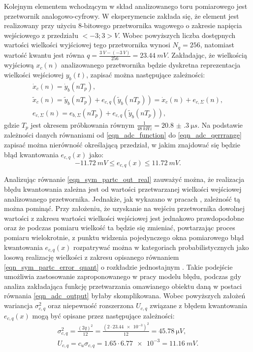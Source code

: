 Kolejnym elementem wchodzącym w skład analizowanego toru pomiarowego jest przetwornik analogowo-cyfrowy. W eksperymencie zakłada się, że element jest realizowany przy użyciu 8-bitowego przetwornika wagowego o zakresie napięcia wejściowego z przedziału $<-3;3>\unit{V}$. Wobec powyższych liczba dostępnych wartości wielkości wyjściowej tego przetwornika wynosi $N_{q} = 256$, natomiast wartość kwantu jest równa $q = \frac{\qty{3}{V} - (\qty{-3}{V})}{256} = \qty{23.44}{mV}$. Zakładając, że wielkością wyjściową $x_{c}(n)$ analizowanego przetwornika będzie dyskretna reprezentacja wielkości wejściowej $y_{b}(t)$, zapisać można następujące zależności:
\begin{gather}
\dot{x}_{c}(n) = \dot{y}_{b}(nT_{p}) \label{eqn_sym_partc_out_ideal}, \\
\tilde{x}_{c}(n) = \tilde{y}_{b}(nT_{p}) + e_{c,q}(\tilde{y}_{b}(nT_{p})) = \dot{x}_{c}(n) + e_{c,\Sigma}(n) \label{eqn_sym_partc_out_real}, \\
e_{c,\Sigma}(n) = e_{b,\Sigma}(nT_{p}) + e_{c,q}(\tilde{y}_{b}(nT_{p})) \label{eqn_sym_partc_error_sum},
\end{gather}
gdzie $T_{p}$ jest okresem próbkowania równym $\frac{1}{\qty{48}{kHz}} = \qty{20.8(3)}{\micro s}$.
Na podstawie zależności danych równaniami od \eqref{eqn_adc_function} do \eqref{eqn_adc_qerrrange} zapisać można nierówność określającą przedział, w jakim znajdować się będzie błąd kwantowania $e_{c,q}(x)$ jako:
\begin{equation}
\qty{-11.72}{mV} \le e_{c,q}(x) \le \qty{11.72}{mV} \label{eqn_sym_partc_error_quant}.
\end{equation}

Analizując równanie \eqref{eqn_sym_partc_out_real} zauważyć można, że realizacja błędu kwantowania zależna jest od wartości przetwarzanej wielkości wejściowej analizowanego przetwornika. Jednakże, jak wykazano w pracach \cite{sienkowski_kwant, sienkowski_adc}, zależność tą można pominąć. Przy założeniu, że uzyskanie na wejściu przetwornika dowolnej wartości z zakresu wartości wielkości wejściowej jest jednakowo prawdopodobne oraz że podczas pomiaru wielkość ta będzie się zmieniać, powtarzając proces pomiaru wielokrotnie, z punktu widzenia pojedynczego okna pomiarowego błąd kwantowania $e_{c,q}(x)$ rozpatrywać można w kategoriach probabilistycznych jako losową realizację wielkości z zakresu opisanego równaniem \eqref{eqn_sym_partc_error_quant} o rozkładzie jednostajnym \cite{jakubiec_system}. Takie podejście umożliwia zastosowanie zaproponowanego w pracy modelu błędu, podczas gdy analiza zakładająca funkcję przetwarzania omawianego obiektu daną w postaci równania \eqref{eqn_adc_output} byłaby skomplikowana. Wobec powyższych założeń wariancja $\sigma_{c,q}^{2}$ oraz niepewność rozszerzona $U_{c,q}$ związane z błędem kwantowania $e_{c,q}(x)$ mogą być opisane przez następujące zależności:
\begin{gather}
\sigma_{c,q}^{2} = \frac{(2q)^{2}}{12} = \frac{(2 \cdot \qty{23.44e-3})^{2}}{12} = \qty{45.78}{\micro V} \label{eqn_sym_partc_var_quant}, \\
U_{c,q} = c_{u} \sigma_{c,q} = 1.65 \cdot \num{6.77e-3} = \qty{11.16}{mV} \label{eqn_sym_partc_uncert_quant}.
\end{gather}

